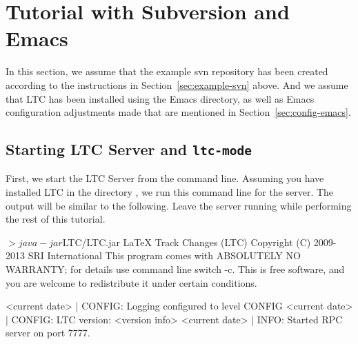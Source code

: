 \section{Tutorial with Subversion and Emacs} \label{sec:tutorial-svn-emacs}

In this section, we assume that the example svn repository has been created according to the instructions in Section~\ref{sec:example-svn} above.  And we assume that LTC has been installed using the Emacs directory, as well as Emacs configuration adjustments made that are mentioned in Section~\ref{sec:config-emacs}.

\subsection{Starting LTC Server and \texttt{ltc-mode}}

First, we start the LTC Server from the command line.  Assuming you have installed LTC in the directory , we run this command line for the server.  The output will be similar to the following.  Leave the server running while performing the rest of this tutorial.
\begin{CodeVerbatim}
$> java -jar $LTC/LTC.jar
LaTeX Track Changes (LTC)  Copyright (C) 2009-2013  SRI International
This program comes with ABSOLUTELY NO WARRANTY; for details use command line switch -c.
This is free software, and you are welcome to redistribute it under certain conditions.

<current date> | CONFIG:  Logging configured to level CONFIG
<current date> | CONFIG:  LTC version: <version info>
<current date> | INFO:    Started RPC server on port 7777.
\end{CodeVerbatim}

